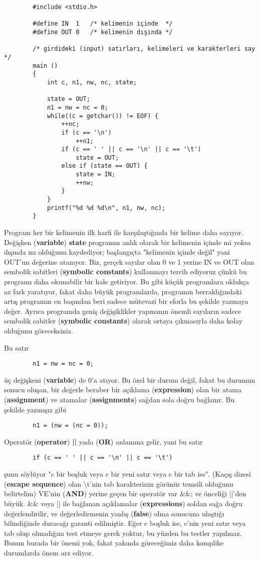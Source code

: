 \documentclass[a4paper,12pt,oneside]{book}
\begin{document}
\begin{lstlisting}
		#include <stdio.h>

		#define IN	1	/* kelimenin içinde  */
		#define OUT 0	/* kelimenin dışında */

		/* girdideki (input) satırları, kelimeleri ve karakterleri say  */
		main ()
		{
			int c, n1, nw, nc, state;

			state = OUT;
			n1 = nw = nc = 0;
			while((c = getchar()) != EOF) {
				++nc;
				if (c == '\n')
					++n1;
				if (c == ' ' || c == '\n' || c == '\t')
					state = OUT;
				else if (state == OUT) {
					state = IN;
					++nw;
				}
			}
			printf("%d %d %d\n", n1, nw, nc);
		}
\end{lstlisting}
\par Program her bir kelimenin ilk harfi ile karşılaştığında bir kelime daha sayıyor. Değişken (\textbf{variable}) \textbf{state} programın anlık olarak bir kelimenin içinde mi yoksa dışında mı olduğunu kaydediyor; başlangıçta "kelimenin içinde değil" yani OUT'un değerine atanıyor. Biz, gerçek sayılar olan 0 ve 1 yerine IN ve OUT olan sembolik sabitleri (\textbf{symbolic constants}) kullanmayı tercih ediyoruz çünkü bu programı daha okunabilir bir hale getiriyor. Bu gibi küçük programlara oldukça az fark yaratıyor, fakat daha büyük programlarda, programın berraklığındaki artış programın en başından beri sadece mütevazi bir eforla bu şekilde yazmaya değer. Ayrıca programda geniş değişiklikler yapmanın önemli sayıların sadece sembolik sabitler (\textbf{symbolic constants}) olarak ortaya çıkmasıyla daha kolay olduğunu göreceksiniz. \pagebreak
\par Bu satır
\begin{lstlisting}
		n1 = nw = nc = 0;
\end{lstlisting}
üç değişkeni (\textbf{variable}) de 0'a atıyor. Bu özel bir durum değil, fakat bu durumun sonucu oluşan, bir değerle beraber bir açıklama (\textbf{expression}) olan bir atama (\textbf{assignment}) ve atamalar (\textbf{assignments}) sağdan sola doğru bağlanır. Bu şekilde yazmışız gibi
\begin{lstlisting}
		n1 = (nw = (nc = 0));
\end{lstlisting}
Operatör (\textbf{operator}) \textbf{||} yada (\textbf{OR}) anlamına gelir, yani bu satır
\begin{lstlisting}
		if (c == ' ' || c == '\n' || c == '\t')
\end{lstlisting}
şunu söylüyor "c bir boşluk veya c bir yeni satır veya c bir tab ise". (Kaçış dizesi (\textbf{escape sequence}) olan \textbackslash t'nin tab karakterinin görünür temsili olduğunu belirtelim) VE'nin (\textbf{AND}) yerine geçen bir operatör var \&\&; ve önceliği ||'den büyük. \&\& veya || ile bağlanan açıklamalar (\textbf{expressions}) soldan sağa doğru değerlendirilir, ve değerledirmenin yanlış (\textbf{false}) olma sonucuna ulaştığı bilindiğinde duracağı garanti edilmiştir. Eğer c boşluk ise, c'nin yeni satır veya tab olup olmadığını test etmeye gerek yoktur, bu yüzden bu testler yapılmaz. Bunun burada bir önemi yok, fakat yakında göreceğimiz daha komplike durumlarda önem arz ediyor.
\end{document}
